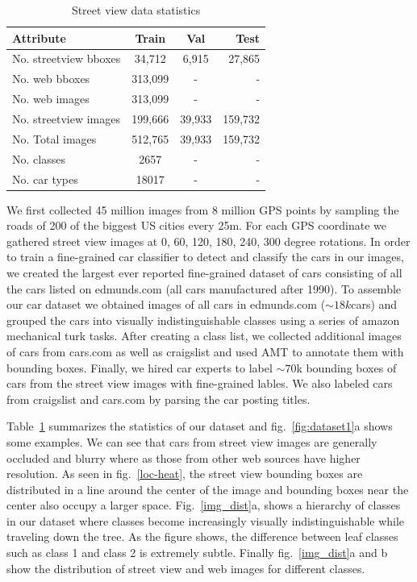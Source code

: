 \documentclass[10pt,twocolumn,letterpaper]{article}
\begin{document}
\begin{table}
\begin{center}
\begin{tabular}{|l|c|c|r|}
\hline
\textbf{Attribute} & \textbf{Train} & \textbf{Val} & \textbf{Test} \\
\hline\hline
No. streetview bboxes & 34,712 & 6,915 &27,865\\
No. web bboxes & 313,099 & - &-\\
No. web images & 313,099 & - &-\\
No. streetview images & 199,666 & 39,933 &159,732\\
No. Total images &512,765&39,933&159,732\\
No. classes & 2657 & - & -\\
No. car types & 18017 & - & -\\
\hline
\end{tabular}
\end{center}
\caption{Street view data statistics}
\label{table:data}
\end{table}
We first collected 45 million images from 8 million GPS points by sampling the roads of 200 of the biggest US cities every 25m. For each GPS coordinate we gathered street view images at 0, 60, 120, 180, 240, 300 degree rotations. In order to train a fine-grained car classifier to detect and classify the cars in our images, we created the largest ever reported fine-grained dataset of cars consisting of all the cars listed on edmunds.com (all cars manufactured after 1990). To assemble our car dataset we obtained images of all cars in edmunds.com (\(\sim18k\)cars) and grouped the cars into visually indistinguishable classes using a series of amazon mechanical turk tasks. After creating a class list, we collected additional images of cars from cars.com as well as craigslist and used AMT to annotate them with bounding boxes. Finally, we hired car experts to label \(\sim 70\)k bounding boxes of cars from the street view images with fine-grained lables. We also labeled cars from craigslist and cars.com by parsing the car posting titles. 

Table~\ref{table:data} summarizes the statistics of our dataset and fig.~\ref{fig:dataset1}a shows some examples. We can see that cars from street view images are generally occluded and blurry where as those from other web sources have higher resolution. As seen in fig.~\ref{loc-heat}, the street view bounding boxes are distributed in a line around the center of the image and bounding boxes near the center also occupy a larger space. Fig.~\ref{img_dist}a, shows a hierarchy of classes in our dataset where classes become increasingly visually indistinguishable while traveling down the tree. As the figure shows, the difference between leaf classes such as class 1 and class 2 is extremely subtle. Finally fig.~\ref{img_dist}a and b show the distribution of street view and web images for different classes. 
\end{document}
